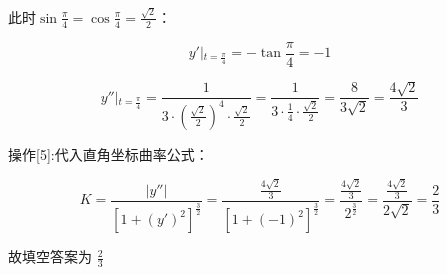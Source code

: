\documentclass[11pt,a4paper,UTF8]{ctexart}
\begin{document}
\begin{solbox}[分步推导与答题规范]
此时$\sin\frac{\pi}{4} = \cos\frac{\pi}{4} = \frac{\sqrt{2}}{2}$：


\begin{equation*}
y'\Big\vert{}_{t=\frac{\pi}{4}} = -\tan\frac{\pi}{4} = -1
\end{equation*}



\begin{equation*}
y''\Big\vert{}_{t=\frac{\pi}{4}} = \frac{1}{3 \cdot \left(\frac{\sqrt{2}}{2}\right)^4 \cdot \frac{\sqrt{2}}{2}} = \frac{1}{3 \cdot \frac{1}{4} \cdot \frac{\sqrt{2}}{2}} = \frac{8}{3\sqrt{2}} = \frac{4\sqrt{2}}{3}
\end{equation*}

\end{solbox}

操作[5]:代入直角坐标曲率公式：

\begin{solbox}[分步推导与答题规范]

\begin{equation*}
K = \frac{\vert{}y''\vert{}}{\left[1 + (y')^2\right]^{\frac{3}{2}}} = \frac{\frac{4\sqrt{2}}{3}}{\left[1 + (-1)^2\right]^{\frac{3}{2}}} = \frac{\frac{4\sqrt{2}}{3}}{2^{\frac{3}{2}}} = \frac{\frac{4\sqrt{2}}{3}}{2\sqrt{2}} = \frac{2}{3}
\end{equation*}


故填空答案为 \textit{}$\frac{2}{3}$\textit{}
\end{solbox}
\end{document}
